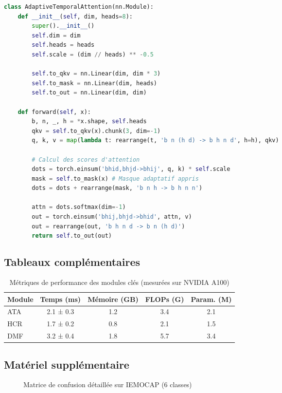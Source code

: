 \documentclass[a4paper,11pt]{article}
\begin{document}
\begin{lstlisting}[language=Python,caption=Extrait du module d'Attention Temporelle Adaptative]
class AdaptiveTemporalAttention(nn.Module):
    def __init__(self, dim, heads=8):
        super().__init__()
        self.dim = dim
        self.heads = heads
        self.scale = (dim // heads) ** -0.5
        
        self.to_qkv = nn.Linear(dim, dim * 3)
        self.to_mask = nn.Linear(dim, heads)
        self.to_out = nn.Linear(dim, dim)

    def forward(self, x):
        b, n, _, h = *x.shape, self.heads
        qkv = self.to_qkv(x).chunk(3, dim=-1)
        q, k, v = map(lambda t: rearrange(t, 'b n (h d) -> b h n d', h=h), qkv)
        
        # Calcul des scores d'attention
        dots = torch.einsum('bhid,bhjd->bhij', q, k) * self.scale
        mask = self.to_mask(x) # Masque adaptatif appris
        dots = dots + rearrange(mask, 'b n h -> b h n n')
        
        attn = dots.softmax(dim=-1)
        out = torch.einsum('bhij,bhjd->bhid', attn, v)
        out = rearrange(out, 'b h n d -> b n (h d)')
        return self.to_out(out)
\end{lstlisting}

\subsection{Tableaux complémentaires}

\begin{table}[h]
\centering
\begin{tabular}{lcccc}
\toprule
Module & Temps (ms) & Mémoire (GB) & FLOPs (G) & Param. (M) \\
\midrule
ATA & 2.1 ± 0.3 & 1.2 & 3.4 & 2.1 \\
HCR & 1.7 ± 0.2 & 0.8 & 2.1 & 1.5 \\
DMF & 3.2 ± 0.4 & 1.8 & 5.7 & 3.4 \\
\bottomrule
\end{tabular}
\caption{Métriques de performance des modules clés (mesurées sur NVIDIA A100)}
\label{tab:modules_perf}
\end{table}

\subsection{Matériel supplémentaire}

\begin{figure}[h]
\centering
\caption{Matrice de confusion détaillée sur IEMOCAP (6 classes)}
\label{fig:confusion_matrix}
\end{figure}
\end{document}
